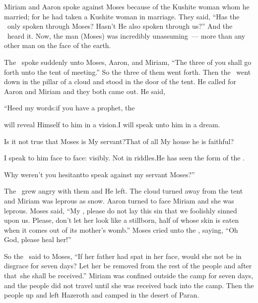 
\begin{inparaenum}
   Miriam and Aaron spoke against Moses because of the Kushite woman whom he married; for he had taken a Kushite woman in marriage.%
   They said, ``Has the \lord\ only spoken through Moses? Hasn't He also spoken through us?'' And the \lord\ heard it.%
   Now, the man (Moses) was incredibly unassuming~--- more than any other man on the face of the earth.%
  
   The \lord\ spoke suddenly unto Moses, Aaron, and Miriam, ``The three of you shall go forth unto the tent of meeting.'' So the three of them went forth.%
   Then the \lord\ went down in the pillar of a cloud and stood in the door of the tent. He called for Aaron and Miriam and they both came out.%
   He said,\smallskip%
  
  \pb ``Heed my words:\pa if you have a prophet, the \lord%
  
  \pb will reveal Himself to him in a vision.\pa I will speak unto him in a dream.%
  
  \pa {} Is it not true that Moses is My servant?\pa That of all My house he is faithful?%
  
  \pa {} I speak to him face to face: visibly. Not in riddles.\pa He has seen the form of the \lord.%
  
  \pb Why weren't you hesitant\pa to speak against my servant Moses?''\smallskip%
  
  \noindent{} The \lord\ grew angry with them and He left.%
   The cloud turned away from the tent and Miriam was leprous as snow. Aaron turned to face Miriam and she was leprous.%
   Moses said, ``My \lord, please do not lay this sin that we foolishly sinned upon us.%
   Please, don't let her look like a stillborn, half of whose skin is eaten when it comes out of its mother's womb.''%
   Moses cried unto the \lord, saying, ``Oh God, please heal her!''%
  
   So the \lord\ said to Moses, ``If her father had spat in her face, would she not be in disgrace for seven days? Let her be removed from the rest of the people and after that\understood\ she shall be received.''%
   Miriam was confined outside the camp for seven days, and the people did not travel until she was received back into the camp.%
   Then the people up and left Hazeroth and camped in the desert of Paran.%
\end{inparaenum}
